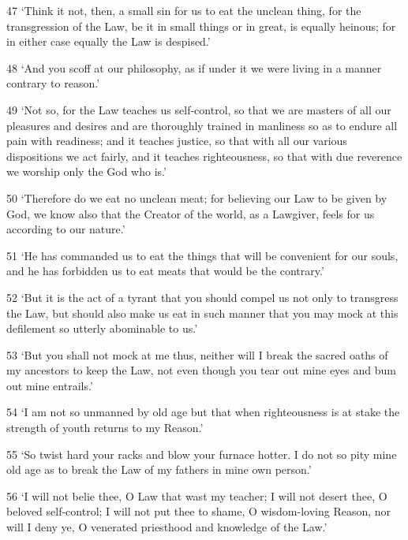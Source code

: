 \par 47 ‘Think it not, then, a small sin for us to eat the unclean thing, for the transgression of the Law, be it in small things or in great, is equally heinous; for in either case equally the Law is despised.’

\par 48 ‘And you scoff at our philosophy, as if under it we were living in a manner contrary to reason.’

\par 49 ‘Not so, for the Law teaches us self-control, so that we are masters of all our pleasures and desires and are thoroughly trained in manliness so as to endure all pain with readiness; and it teaches justice, so that with all our various dispositions we act fairly, and it teaches righteousness, so that with due reverence we worship only the God who is.’

\par 50 ‘Therefore do we eat no unclean meat; for believing our Law to be given by God, we know also that the Creator of the world, as a Lawgiver, feels for us according to our nature.’

\par 51 ‘He has commanded us to eat the things that will be convenient for our souls, and he has forbidden us to eat meats that would be the contrary.’

\par 52 ‘But it is the act of a tyrant that you should compel us not only to transgress the Law, but should also make us eat in such manner that you may mock at this defilement so utterly abominable to us.’

\par 53 ‘But you shall not mock at me thus, neither will I break the sacred oaths of my ancestors to keep the Law, not even though you tear out mine eyes and bum out mine entrails.’

\par 54 ‘I am not so unmanned by old age but that when righteousness is at stake the strength of youth returns to my Reason.’

\par 55 ‘So twist hard your racks and blow your furnace hotter. I do not so pity mine old age as to break the Law of my fathers in mine own person.’

\par 56 ‘I will not belie thee, O Law that wast my teacher; I will not desert thee, O beloved self-control; I will not put thee to shame, O wisdom-loving Reason, nor will I deny ye, O venerated priesthood and knowledge of the Law.’

